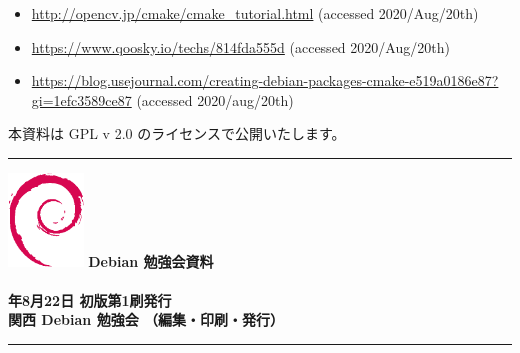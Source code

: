 \documentclass[mingoth,a4paper]{jsarticle}
\newcommand{\debmtgyear}{2020}
\newcommand{\debmtgdate}{22}
\newcommand{\debmtgmonth}{8}
\begin{document}
\begin{itemize}
\item \url{http://opencv.jp/cmake/cmake_tutorial.html} (accessed 2020/Aug/20th)
\item \url{https://www.qoosky.io/techs/814fda555d} (accessed 2020/Aug/20th)
\item \url{https://blog.usejournal.com/creating-debian-packages-cmake-e519a0186e87?gi=1efc3589ce87} (accessed 2020/aug/20th)
\end{itemize}

\vspace{\fill}
本資料は GPL v 2.0 のライセンスで公開いたします。

\clearpage

%


\printindex

 \begin{minipage}[b]{0.2\hsize}
 \end{minipage}
 \begin{minipage}[b]{0.8\hsize}

 \vspace*{15cm}
 \rule{\hsize}{1mm}
 \vspace{2mm}
 \includegraphics[width=2cm]{image200502/openlogo-nd.eps}
 \noindent \Large \bfseries{Debian 勉強会資料}\\ \\
 \noindent \normalfont \debmtgyear{}年\debmtgmonth{}月\debmtgdate{}日 \hspace{5mm}  初版第1刷発行\\
 \noindent \normalfont 関西 Debian 勉強会 （編集・印刷・発行）\\
 \rule{\hsize}{1mm}
 \end{minipage}
\end{document}
